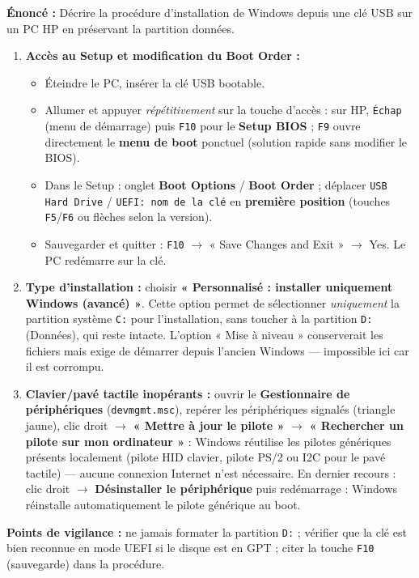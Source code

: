 \documentclass[11pt]{article}
\begin{document}
\begin{corrige}
\textbf{Énoncé :} Décrire la procédure d'installation de Windows depuis une clé USB sur un PC HP en préservant la partition données.
\tcblower
\begin{enumerate}
    \item \textbf{Accès au Setup et modification du Boot Order :}
    \begin{itemize}
        \item Éteindre le PC, insérer la clé USB bootable.
        \item Allumer et appuyer \emph{répétitivement} sur la touche d'accès : sur HP, \texttt{Échap} (menu de démarrage) puis \texttt{F10} pour le \textbf{Setup BIOS} ; \texttt{F9} ouvre directement le \textbf{menu de boot} ponctuel (solution rapide sans modifier le BIOS).
        \item Dans le Setup : onglet \textbf{Boot Options} / \textbf{Boot Order} ; déplacer \texttt{USB Hard Drive} / \texttt{UEFI: nom de la clé} en \textbf{première position} (touches \texttt{F5}/\texttt{F6} ou flèches selon la version).
        \item Sauvegarder et quitter : \texttt{F10} $\rightarrow$ « Save Changes and Exit » $\rightarrow$ Yes. Le PC redémarre sur la clé.
    \end{itemize}
    \item \textbf{Type d'installation :} choisir \textbf{« Personnalisé : installer uniquement Windows (avancé) »}. Cette option permet de sélectionner \emph{uniquement} la partition système \texttt{C:} pour l'installation, sans toucher à la partition \texttt{D:} (Données), qui reste intacte. L'option « Mise à niveau » conserverait les fichiers mais exige de démarrer depuis l'ancien Windows — impossible ici car il est corrompu.
    \item \textbf{Clavier/pavé tactile inopérants :} ouvrir le \textbf{Gestionnaire de périphériques} (\texttt{devmgmt.msc}), repérer les périphériques signalés (triangle jaune), clic droit $\rightarrow$ \textbf{« Mettre à jour le pilote »} $\rightarrow$ \textbf{« Rechercher un pilote sur mon ordinateur »} : Windows réutilise les pilotes génériques présents localement (pilote HID clavier, pilote PS/2 ou I2C pour le pavé tactile) — aucune connexion Internet n'est nécessaire. En dernier recours : clic droit $\rightarrow$ \textbf{Désinstaller le périphérique} puis redémarrage : Windows réinstalle automatiquement le pilote générique au boot.
\end{enumerate}

\textbf{Points de vigilance :} ne jamais formater la partition \texttt{D:} ; vérifier que la clé est bien reconnue en mode UEFI si le disque est en GPT ; citer la touche \texttt{F10} (sauvegarde) dans la procédure.
\end{corrige}
\end{document}
